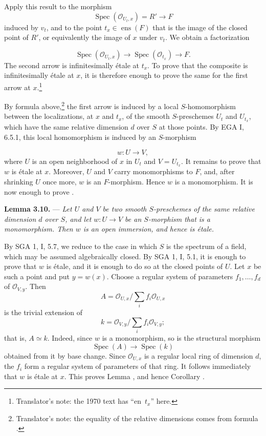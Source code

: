 Apply this result to the morphism
\[
  \operatorname{Spec}(\mathscr O_{U_t,x})=R'\longrightarrow F
\]
induced by \(v_t\), and to the point
\(t_x\in\operatorname{ens}(F)\) that is the image of the closed point
of \(R'\), or equivalently the image of \(x\) under \(v_t\).  We
obtain a factorization

\[
  \operatorname{Spec}(\mathscr O_{U_t,x})
  \longrightarrow
  \operatorname{Spec}(\mathscr O_{t_x})
  \longrightarrow F.
\]
The second arrow is infinitesimally étale at \(t_x\).  To prove that
the composite is infinitesimally étale at \(x\), it is therefore
enough to prove the same for the first arrow at \(x\).\footnote{Translator's note: the
1970 text has ``en~\(t_x\)'' here.}

By formula 
above,\footnote{Translator's note: the equality of the relative dimensions comes from formula
.}
the first arrow is induced by a local \(S\)-homomorphism between the
localizations, at \(x\) and \(t_x\), of the smooth \(S\)-preschemes
\(U_t\) and \(U_{t_x}\), which have the same relative dimension
\(d\) over \(S\) at those points.  By EGA I, 6.5.1, this local
homomorphism is induced by an \(S\)-morphism

\[
  w:U\longrightarrow V,
\]
where \(U\) is an open neighborhood of \(x\) in \(U_t\) and
\(V=U_{t_x}\).  It remains to prove that \(w\) is étale at \(x\).
Moreover, \(U\) and \(V\) carry monomorphisms to \(F\), and, after
shrinking \(U\) once more, \(w\) is an \(F\)-morphism.  Hence \(w\)
is a monomorphism.  It is now enough to prove .

\medskip
\noindent{}\textbf{Lemma 3.10.} ---
\textit{Let \(U\) and \(V\) be two smooth \(S\)-preschemes of the
same relative dimension \(d\) over \(S\), and let \(w:U\to V\) be an
\(S\)-morphism that is a monomorphism.  Then \(w\) is an open
immersion, and hence is étale.}

By SGA 1, I, 5.7, we reduce to the case in which \(S\) is the
spectrum of a field, which may be assumed algebraically closed.  By
SGA 1, I, 5.1, it is enough to prove that \(w\) is étale, and it is
enough to do so at the closed points of \(U\).  Let \(x\) be such a
point and put \(y=w(x)\).  Choose a regular system of parameters
\(f_1,\ldots,f_d\) of \(\mathscr O_{V,y}\).  Then
\[
  A=
  \mathscr O_{U,x}\big/\sum_i f_i\mathscr O_{U,x}
\]
is the trivial extension of
\[
  k=
  \mathscr O_{V,y}\big/\sum_i f_i\mathscr O_{V,y};
\]
that is, \(A\simeq k\).  Indeed, since \(w\) is a monomorphism, so is
the structural morphism
\[
  \operatorname{Spec}(A)\longrightarrow\operatorname{Spec}(k)
\]
obtained from it by base change.  Since \(\mathscr O_{U,x}\) is a
regular local ring of dimension \(d\), the \(f_i\) form a regular
system of parameters of that ring.  It follows immediately that
\(w\) is étale at \(x\).  This proves Lemma
, and hence Corollary
.

